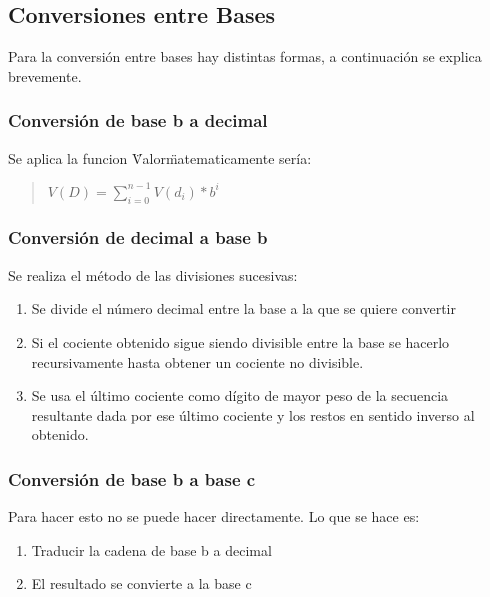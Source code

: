 \documentclass{article}
\begin{document}
\subsection{Conversiones entre Bases}
Para la conversión  entre bases hay distintas formas, a continuación se explica
brevemente.
\subsubsection{Conversión de base b a decimal}
Se aplica la funcion \"Valor\" matematicamente sería:
\begin{quote}
    $V(D) = \sum_{i = 0}^{n - 1} V(d_i)*b^i$
\end{quote}
\subsubsection{Conversión de decimal a base b}
Se realiza el método de las divisiones sucesivas:
 \begin{enumerate}
    \item Se divide el número decimal entre la base a la que se quiere convertir
    \item Si el cociente obtenido sigue siendo divisible entre la base se hacerlo
    recursivamente hasta obtener un cociente no divisible.
    \item Se usa el último cociente como dígito de mayor peso de la secuencia 
    resultante dada por ese último cociente y los restos en sentido inverso
    al obtenido.
 \end{enumerate}
\subsubsection{Conversión de base b a base c}
Para hacer esto no se puede hacer directamente. Lo que se hace es:
\begin{enumerate}
    \item Traducir la cadena de base b a decimal
    \item El resultado se convierte a la base c
\end{enumerate}
\end{document}
